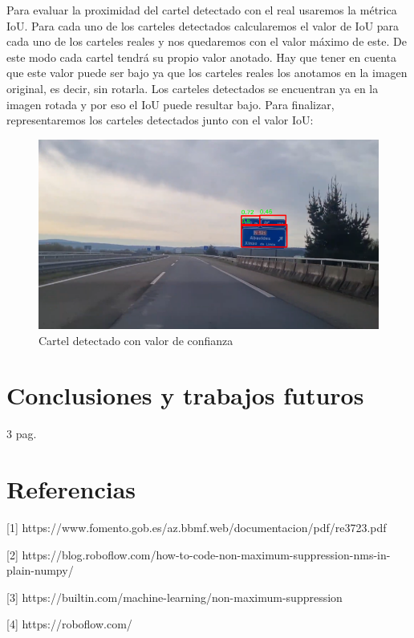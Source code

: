 \documentclass[a4paper, 12pt]{article}
\begin{document}
Para evaluar la proximidad del cartel detectado con el real usaremos la métrica IoU. Para cada uno de los carteles detectados calcularemos el valor de IoU para cada uno de los carteles reales y nos quedaremos con el valor máximo de este. De este modo cada cartel tendrá su propio valor anotado. Hay que tener en cuenta que este valor puede ser bajo ya que los carteles reales los anotamos en la imagen original, es decir, sin rotarla. Los carteles detectados se encuentran ya en la imagen rotada y por eso el IoU puede resultar bajo. Para finalizar, representaremos los carteles detectados junto con el valor IoU:
\begin{figure}[h]
	\centering
	\includegraphics[width=0.7\linewidth]{img/cartelConIoU.png}
	\caption{Cartel detectado con valor de confianza}
	\label{fig:cartelIoU}
\end{figure}



\section{Conclusiones y trabajos futuros}
3 pag.
\section{Referencias}
[1] https://www.fomento.gob.es/az.bbmf.web/documentacion/pdf/re3723.pdf

[2] https://blog.roboflow.com/how-to-code-non-maximum-suppression-nms-in-plain-numpy/

[3] https://builtin.com/machine-learning/non-maximum-suppression

[4] https://roboflow.com/
\end{document}

